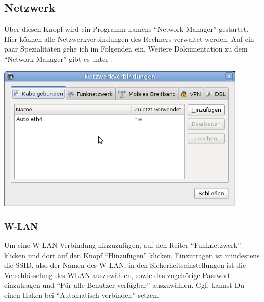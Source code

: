 \documentclass[a4paper,12pt,twoside]{article}
\begin{document}
\subsection{Netzwerk}
\label{sct:dialog_netzwerk}
Über diesen Knopf wird ein Programm namens
"`Network-Manager"' gestartet. Hier können
alle Netzwerkverbindungen des Rechners verwaltet werden. Auf ein paar
Spezialitäten gehe ich im Folgenden ein. Weitere Dokumentation zu dem
"`Network-Manager"' gibt es unter \cite{NWM1}.

\bigskip
\begin{minipage}{\linewidth}
    \centering
    \includegraphics[width=12cm]{efaLivede-img/efaLivede-img23.png}
    \label{fig:dialog_netzwerk}
\end{minipage}


\subsubsection{W-LAN}
\label{sct:wifi}
Um eine W-LAN Verbindung hinzuzufügen, auf den Reiter
"`Funknetzwerk"' klicken und dort auf den
Knopf "`Hinzufügen"' klicken. Einzutragen ist
mindestens die SSID, also der Namen des W-LAN, in den
Sicherheitseinstellungen ist die Verschlüsselung des WLAN auszuwählen,
sowie das zugehörige Passwort einzutragen und "`Für alle
Benutzer verfügbar"' auszuwählen. Ggf. kannst Du einen
Haken bei "`Automatisch verbinden"' setzen.
\end{document}
